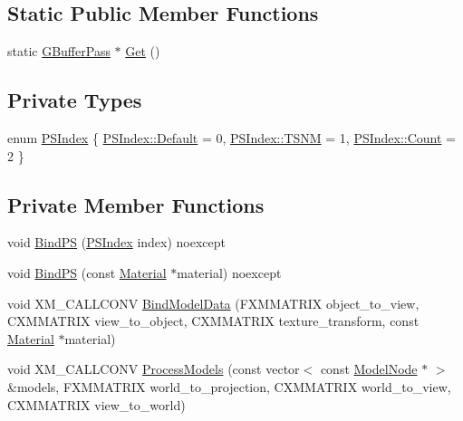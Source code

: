 \subsection*{Static Public Member Functions}
\begin{DoxyCompactItemize}
\item 
static \hyperlink{classmage_1_1_g_buffer_pass}{G\+Buffer\+Pass} $\ast$ \hyperlink{classmage_1_1_g_buffer_pass_ab2a50a7bde900978153badaa49cf047c}{Get} ()
\end{DoxyCompactItemize}
\subsection*{Private Types}
\begin{DoxyCompactItemize}
\item 
enum \hyperlink{classmage_1_1_g_buffer_pass_a1dbae3cb33d9c90ce7eb8c119d576379}{P\+S\+Index} \{ \hyperlink{classmage_1_1_g_buffer_pass_a1dbae3cb33d9c90ce7eb8c119d576379a7a1920d61156abc05a60135aefe8bc67}{P\+S\+Index\+::\+Default} = 0, 
\hyperlink{classmage_1_1_g_buffer_pass_a1dbae3cb33d9c90ce7eb8c119d576379a6e02c9f63944ea221e7d55c11ecae07b}{P\+S\+Index\+::\+T\+S\+NM} = 1, 
\hyperlink{classmage_1_1_g_buffer_pass_a1dbae3cb33d9c90ce7eb8c119d576379ae93f994f01c537c4e2f7d8528c3eb5e9}{P\+S\+Index\+::\+Count} = 2
 \}
\end{DoxyCompactItemize}
\subsection*{Private Member Functions}
\begin{DoxyCompactItemize}
\item 
void \hyperlink{classmage_1_1_g_buffer_pass_a750c27aa6f562b53d62f845ce50e731d}{Bind\+PS} (\hyperlink{classmage_1_1_g_buffer_pass_a1dbae3cb33d9c90ce7eb8c119d576379}{P\+S\+Index} index) noexcept
\item 
void \hyperlink{classmage_1_1_g_buffer_pass_acf03db3d75a3dbacb5c002f6bc72e5ee}{Bind\+PS} (const \hyperlink{structmage_1_1_material}{Material} $\ast$material) noexcept
\item 
void X\+M\+\_\+\+C\+A\+L\+L\+C\+O\+NV \hyperlink{classmage_1_1_g_buffer_pass_a5296050798e8430601e0f42d1f8327db}{Bind\+Model\+Data} (F\+X\+M\+M\+A\+T\+R\+IX object\+\_\+to\+\_\+view, C\+X\+M\+M\+A\+T\+R\+IX view\+\_\+to\+\_\+object, C\+X\+M\+M\+A\+T\+R\+IX texture\+\_\+transform, const \hyperlink{structmage_1_1_material}{Material} $\ast$material)
\item 
void X\+M\+\_\+\+C\+A\+L\+L\+C\+O\+NV \hyperlink{classmage_1_1_g_buffer_pass_abd4c5154aefd3d8e9befdb572b37f40d}{Process\+Models} (const vector$<$ const \hyperlink{classmage_1_1_model_node}{Model\+Node} $\ast$ $>$ \&models, F\+X\+M\+M\+A\+T\+R\+IX world\+\_\+to\+\_\+projection, C\+X\+M\+M\+A\+T\+R\+IX world\+\_\+to\+\_\+view, C\+X\+M\+M\+A\+T\+R\+IX view\+\_\+to\+\_\+world)
\end{DoxyCompactItemize}
